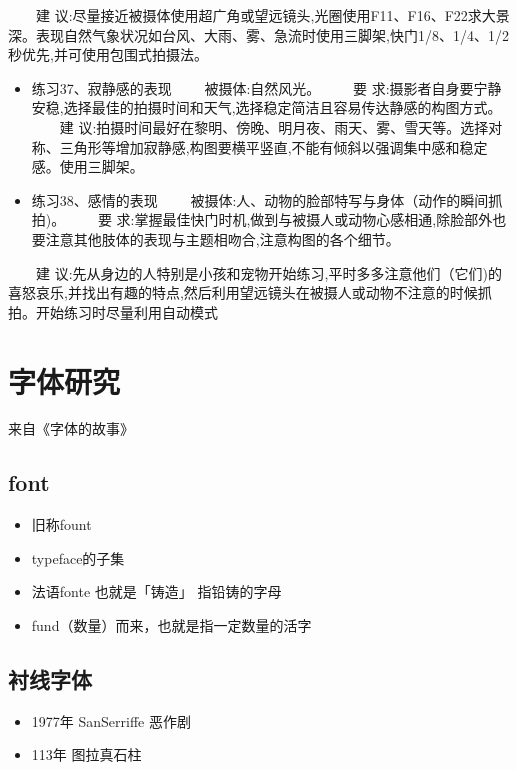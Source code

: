 \documentclass[
  letterpaper,
  DIV=11,
  numbers=noendperiod]{scrreprt}
\providecommand{\tightlist}{%
  \setlength{\itemsep}{0pt}\setlength{\parskip}{0pt}}\usepackage{longtable,booktabs,array}
\begin{document}
　　建
议:尽量接近被摄体使用超广角或望远镜头,光圈使用F11、F16、F22求大景深。表现自然气象状况如台风、大雨、雾、急流时使用三脚架,快门1/8、1/4、1/2秒优先,并可使用包围式拍摄法。

\begin{itemize}
\item
  练习37、寂静感的表现 　　被摄体:自然风光。 　　要
  求:摄影者自身要宁静安稳,选择最佳的拍摄时间和天气,选择稳定简洁且容易传达静感的构图方式。
  　　建
  议:拍摄时间最好在黎明、傍晚、明月夜、雨天、雾、雪天等。选择对称、三角形等增加寂静感,构图要横平竖直,不能有倾斜以强调集中感和稳定感。使用三脚架。
\item
  练习38、感情的表现
  　　被摄体:人、动物的脸部特写与身体（动作的瞬间抓拍)。 　　要
  求:掌握最佳快门时机,做到与被摄人或动物心感相通,除脸部外也要注意其他肢体的表现与主题相吻合,注意构图的各个细节。
\end{itemize}

　　建
议:先从身边的人特别是小孩和宠物开始练习,平时多多注意他们（它们)的喜怒哀乐,并找出有趣的特点,然后利用望远镜头在被摄人或动物不注意的时候抓拍。开始练习时尽量利用自动模式

\section{字体研究}\label{ux5b57ux4f53ux7814ux7a76}

来自《字体的故事》

\subsection{font}\label{font}

\begin{itemize}
\tightlist
\item
  旧称fount
\item
  typeface的子集
\item
  法语fonte 也就是「铸造」 指铅铸的字母
\item
  fund（数量）而来，也就是指一定数量的活字
\end{itemize}

\subsection{衬线字体}\label{ux886cux7ebfux5b57ux4f53}

\begin{itemize}
\tightlist
\item
  1977年 SanSerriffe 恶作剧
\item
  113年 图拉真石柱
\end{itemize}
\end{document}
